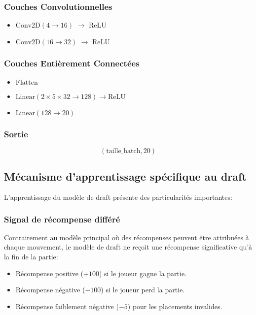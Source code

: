 \documentclass[]{article}
\begin{document}
\subsubsection{Couches Convolutionnelles}
\begin{itemize}
    \item \(\text{Conv2D}(4 \rightarrow 16)\) \(\rightarrow\) ReLU
    \item \(\text{Conv2D}(16 \rightarrow 32)\) \(\rightarrow\) ReLU
\end{itemize}

\subsubsection{Couches Entièrement Connectées}
\begin{itemize}
    \item \(\text{Flatten}\)
    \item \(\text{Linear}(2 \times 5 \times 32 \rightarrow 128) \rightarrow \text{ReLU}\)
    \item \(\text{Linear}(128 \rightarrow 20)\)
\end{itemize}

\subsubsection{Sortie}
\[
(\text{taille\_batch}, 20)
\]

\subsection{Mécanisme d'apprentissage spécifique au draft}
L'apprentissage du modèle de draft présente des particularités importantes:

\subsubsection{Signal de récompense différé}
Contrairement au modèle principal où des récompenses peuvent être attribuées à chaque mouvement, le modèle de draft ne reçoit une récompense significative qu'à la fin de la partie:
\begin{itemize}
    \item Récompense positive (\(+100\)) si le joueur gagne la partie.
    \item Récompense négative (\(-100\)) si le joueur perd la partie.
    \item Récompense faiblement négative (\(-5\)) pour les placements invalides.
\end{itemize}
\end{document}
